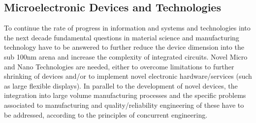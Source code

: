 \subsection{Microelectronic Devices and Technologies}

To continue the rate of progress in information and systems and
technologies into the next decade fundamental questions in material
science and manufacturing technology have to be answered to further
reduce the device dimension into the sub 100nm arena and increase
the complexity of integrated circuits. Novel Micro and Nano
Technologies are needed, either to overcome limitations to further
shrinking of devices and/or to implement novel electronic
hardware/services (such as large flexible displays). In parallel to
the development of novel devices, the integration into large volume
manufacturing processes and the specific problems associated to
manufacturing and quality/reliability engineering of these have to
be addressed, according to the principles of concurrent engineering.

